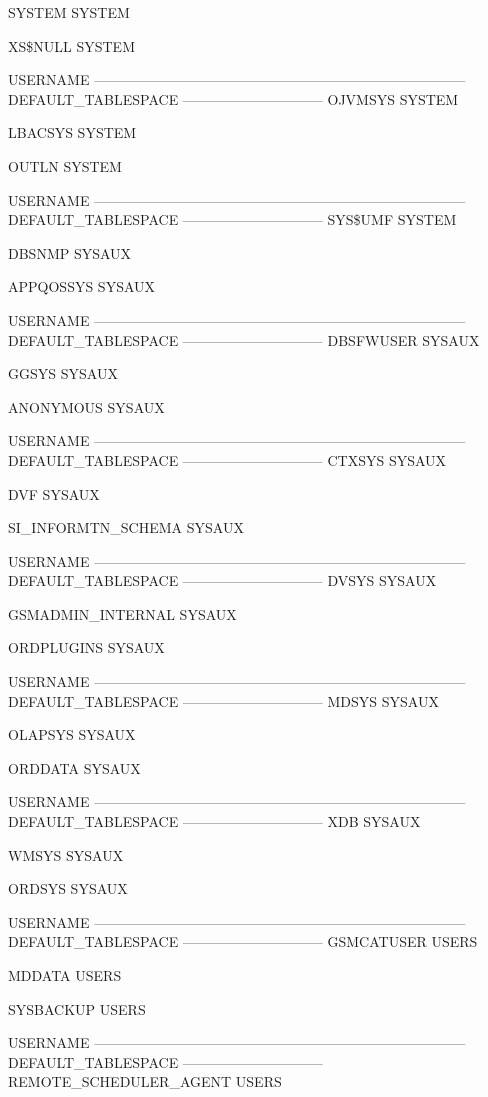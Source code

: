 \documentclass{article}
\begin{document}
\begin{enumerate}
\begin{messageshell}
SYSTEM
SYSTEM

XS\$NULL
SYSTEM


USERNAME
--------------------------------------------------------------------------------
DEFAULT_TABLESPACE
------------------------------
OJVMSYS
SYSTEM

LBACSYS
SYSTEM

OUTLN
SYSTEM


USERNAME
--------------------------------------------------------------------------------
DEFAULT_TABLESPACE
------------------------------
SYS\$UMF
SYSTEM

DBSNMP
SYSAUX

APPQOSSYS
SYSAUX


USERNAME
--------------------------------------------------------------------------------
DEFAULT_TABLESPACE
------------------------------
DBSFWUSER
SYSAUX

GGSYS
SYSAUX

ANONYMOUS
SYSAUX


USERNAME
--------------------------------------------------------------------------------
DEFAULT_TABLESPACE
------------------------------
CTXSYS
SYSAUX

DVF
SYSAUX

SI_INFORMTN_SCHEMA
SYSAUX


USERNAME
--------------------------------------------------------------------------------
DEFAULT_TABLESPACE
------------------------------
DVSYS
SYSAUX

GSMADMIN_INTERNAL
SYSAUX

ORDPLUGINS
SYSAUX


USERNAME
--------------------------------------------------------------------------------
DEFAULT_TABLESPACE
------------------------------
MDSYS
SYSAUX

OLAPSYS
SYSAUX

ORDDATA
SYSAUX


USERNAME
--------------------------------------------------------------------------------
DEFAULT_TABLESPACE
------------------------------
XDB
SYSAUX

WMSYS
SYSAUX

ORDSYS
SYSAUX


USERNAME
--------------------------------------------------------------------------------
DEFAULT_TABLESPACE
------------------------------
GSMCATUSER
USERS

MDDATA
USERS

SYSBACKUP
USERS


USERNAME
--------------------------------------------------------------------------------
DEFAULT_TABLESPACE
------------------------------
REMOTE_SCHEDULER_AGENT
USERS


\end{messageshell}
\end{enumerate}
\end{document}
